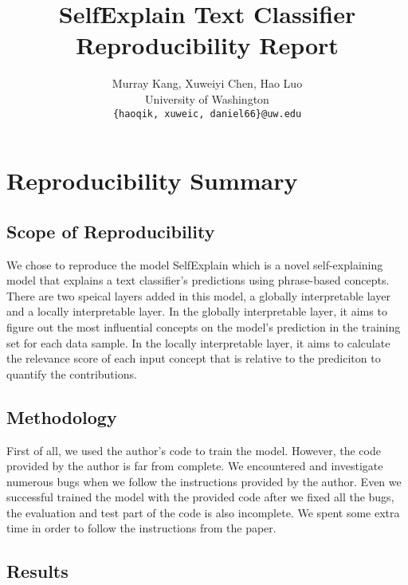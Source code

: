 \documentclass{article}
\title{SelfExplain Text Classifier Reproducibility Report}
\author{%
  Murray Kang,  Xuweiyi Chen,  Hao Luo \\ %
  University of Washington \\
 \texttt{\{haoqik, xuweic, daniel66\}@uw.edu} \\ %
}
\begin{document}
\maketitle



\section*{\centering Reproducibility Summary}


\subsection*{Scope of Reproducibility}

We chose to reproduce the model SelfExplain which is a novel self-explaining model that explains a text classifier's predictions using phrase-based concepts. There are two speical layers added in this model, a globally interpretable layer and a locally interpretable layer. In the globally interpretable layer, it aims to figure out the most influential concepts on the model's prediction in the training set for each data sample. In the locally interpretable layer, it aims to calculate the relevance score of each input concept that is relative to the prediciton to quantify the contributions.

\subsection*{Methodology}

First of all, we used the author's code to train the model. However, the code provided by 
the author is far from complete. We encountered and investigate numerous bugs when we follow
the instructions provided by the author. Even we successful trained the model with the provided 
code after we fixed all the bugs, the evaluation and test part of the code is also incomplete. 
We spent some extra time in order to follow the instructions from the paper.

\subsection*{Results}
\end{document}
